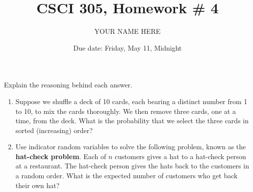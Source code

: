 \documentclass{article}
\title{CSCI 305, Homework \# 4}
\author{YOUR NAME HERE}
\date{Due date:  Friday, May 11, Midnight}
\begin{document}
    
    \maketitle
    
    Explain the reasoning behind each answer.
    
    \begin{enumerate}
    
    \item
      Suppose we shuffle a deck of 10 cards, each bearing a distinct
      number from 1 to 10, to mix the cards thoroughly.  We then remove
      three cards, one at a time, from the deck.  What is the probability
      that we select the three cards in sorted (increasing) order?
    
    \item
      Use indicator random variables to solve the following problem,
      known as the {\bf hat-check problem}.
      Each of $n$ customers gives a hat to a hat-check person at a
      restaurant.  The hat-check person gives the hats back to the customers
      in a random order.  What is the expected number of customers who get
      back their own hat?
    
    \end{enumerate}
    
    
\end{document}
